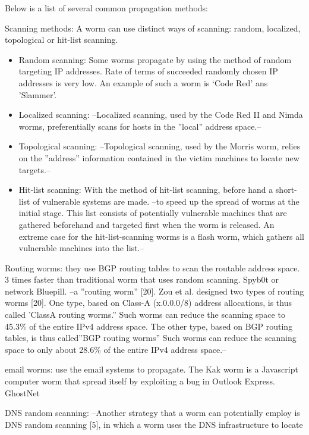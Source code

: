 Below is a list of several common propagation methods:

\begin{description}
\item Scanning methods: A worm can use distinct ways of scanning: random, localized, topological or hit-list scanning.
\begin{itemize}
\item Random scanning: Some worms propagate by using the method of random targeting IP addresses. Rate of terms of succeeded randomly chosen IP addresses is very low. An example of such a worm is `Code Red' ans 'Slammer'.
\item Localized scanning: --Localized scanning,
used by the Code Red II and Nimda worms, preferentially
scans for hosts in the ''local'' address space.--
\item Topological scanning: --Topological scanning, used by the Morris worm, relies
on the ''address'' information contained in the victim
machines to locate new targets.--
\item Hit-list scanning: With the method of hit-list scanning, before hand a short-list of vulnerable systems are made. --to speed up
the spread of worms at the initial stage. This list consists
of potentially vulnerable machines that are gathered
beforehand and targeted first when the worm
is released. An extreme case for the hit-list-scanning
worms is a flash worm, which gathers all vulnerable
machines into the list.--
\end{itemize}   
\item Routing worms: they use BGP routing tables to scan the routable address space. 3 times faster than traditional worm that uses random scanning. Spyb0t or network Bluepill. --a ''routing worm'' [20]. Zou et al. designed two types
of routing worms [20]. One type, based on Class-A
(x.0.0.0/8) address allocations, is thus called 'ClassA
routing worms.'' Such worms can reduce the scanning
space to 45.3\% of the entire IPv4 address space.
The other type, based on BGP routing tables, is thus
called''BGP routing worms'' Such worms can reduce
the scanning space to only about 28.6\% of the entire
IPv4 address space.--
\item email worms: use the email systems to propagate. The Kak worm is a Javascript computer worm that spread itself by exploiting a bug in Outlook Express.  GhostNet
\item DNS random scanning: --Another strategy that a worm
can potentially employ is DNS random scanning [5],
in which a worm uses the DNS infrastructure to locate

\end{description}
